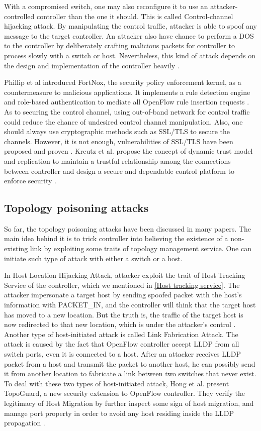 With a compromised switch, one may also reconfigure it to use an attacker-controlled controller than the one it should. This is called Control-channel hijacking attack. By manipulating the control traffic, attacker is able to spoof any message to the target controller. An attacker also have chance to perform a DOS to the controller by deliberately crafting malicious packets for controller to process slowly with a switch or host. Nevertheless, this kind of attack depends on the design and implementation of the controller heavily \cite{AAS14}.

Phillip et al introduced FortNox, the security policy enforcement kernel, as a countermeasure to malicious applications. It implements a rule detection engine and role-based authentication to mediate all OpenFlow rule insertion requests \cite{PSYFTG12}. As to securing the control channel, using out-of-band network for control traffic could reduce the chance of undesired control channel manipulation. Also, one should always use cryptographic methods such as SSL/TLS to secure the channels. However, it is not enough, vulnerabilities of SSL/TLS have been proposed and proven \cite{HRKC12}. Kreutz et al. propose the concept of dynamic trust model and replication to maintain a trustful relationship among the connections between controller and design a secure and dependable control platform to enforce security \cite{KDFRV13}. 

\subsection{Topology poisoning attacks}
So far, the topology poisoning attacks have been discussed in many papers. The main idea behind it is to trick controller into believing the existence of a non-existing link by exploiting some traits of topology management service. One can initiate such type of attack with either a switch or a host.

In Host Location Hijacking Attack, attacker exploit the trait of Host Tracking Service of the controller, which we mentioned in \ref{Host tracking service}. The attacker impersonate a target host by sending spoofed packet with the host's information with PACKET\_IN, and the controller will think that the target host has moved to a new location. But the truth is, the traffic of the target host is now redirected to that new location, which is under the attacker's control \cite{HXWG15}. Another type of host-initiated attack is called Link Fabrication Attack. The attack is caused by the fact that OpenFlow controller accept LLDP from all switch ports, even it is connected to a host. After an attacker receives LLDP packet from a host and transmit the packet to another host, he can possibly send it from another location to fabricate a link between two switches that never exist. To deal with these two types of host-initiated attack, Hong et al. present TopoGuard, a new security extension to OpenFlow controller. They verify the legitimacy of Host Migration by further inspect some sign of host migration, and manage port property in order to avoid any host residing inside the LLDP propagation \cite{HXWG15}. 

